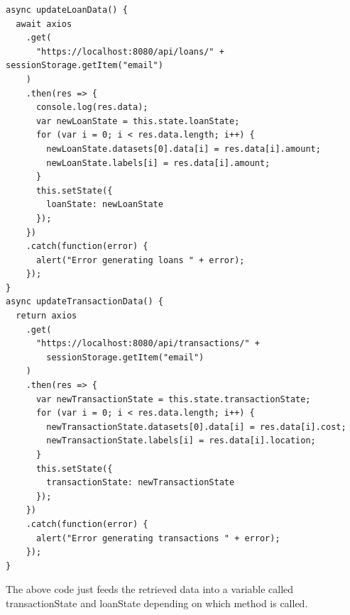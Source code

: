 \begin{verbatim}
async updateLoanData() {
  await axios
    .get(
      "https://localhost:8080/api/loans/" + sessionStorage.getItem("email")
    )
    .then(res => {
      console.log(res.data);
      var newLoanState = this.state.loanState;
      for (var i = 0; i < res.data.length; i++) {
        newLoanState.datasets[0].data[i] = res.data[i].amount;
        newLoanState.labels[i] = res.data[i].amount;
      }
      this.setState({
        loanState: newLoanState
      });
    })
    .catch(function(error) {
      alert("Error generating loans " + error);
    });
}
async updateTransactionData() {
  return axios
    .get(
      "https://localhost:8080/api/transactions/" +
        sessionStorage.getItem("email")
    )
    .then(res => {
      var newTransactionState = this.state.transactionState;
      for (var i = 0; i < res.data.length; i++) {
        newTransactionState.datasets[0].data[i] = res.data[i].cost;
        newTransactionState.labels[i] = res.data[i].location;
      }
      this.setState({
        transactionState: newTransactionState
      });
    })
    .catch(function(error) {
      alert("Error generating transactions " + error);
    });
}
\end{verbatim}
The above code just feeds the retrieved data into a variable called transactionState and loanState depending on which method
is called.
